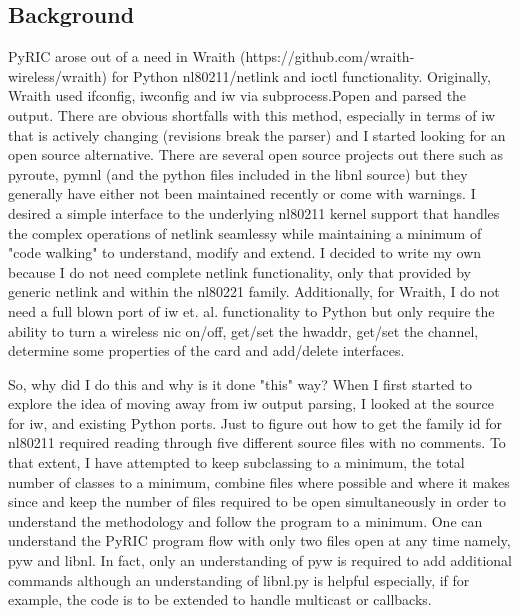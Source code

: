 \documentclass[11pt]{article}
\begin{document}
\subsection{Background}
PyRIC arose out of a need in Wraith (https://github.com/wraith-wireless/wraith)
for Python nl80211/netlink and ioctl functionality. Originally, Wraith used
ifconfig, iwconfig and iw via subprocess.Popen and parsed the output. There
are obvious shortfalls with this method, especially in terms of iw that is
actively changing (revisions break the parser) and I started looking for an
open source alternative. There are several open source projects out there
such as pyroute, pymnl (and the python files included in the libnl source) but
they generally have either not been maintained recently or come with warnings.
I desired a simple interface to the underlying nl80211 kernel support that
handles the complex operations of netlink seamlessy while maintaining a minimum
of "code walking" to understand, modify and extend. I decided to write my own
because I do not need complete netlink functionality, only that provided by
generic netlink and within the nl80221 family. Additionally, for Wraith, I do
not need a full blown port of iw et. al. functionality to Python but only
require the ability to turn a wireless nic on/off, get/set the hwaddr, get/set
the channel, determine some properties of the card and add/delete interfaces.

So, why did I do this and why is it done "this" way? When I first started to
explore the idea of moving away from iw output parsing, I looked at the source
for iw, and existing Python ports. Just to figure out how to get the family id
for nl80211 required reading through five different source files with no
comments. To that extent, I have attempted to keep subclassing to a minimum,
the total number of classes to a minimum, combine files where possible and where
it makes since and keep the number of files required to be open simultaneously
in order to understand the methodology and follow the program to a minimum. One
can understand the PyRIC program flow with only two files open at any time namely,
pyw and libnl. In fact, only an understanding of pyw is required to add additional
commands although an understanding of libnl.py is helpful especially, if for
example, the code is to be extended to handle multicast or callbacks.
\end{document}

